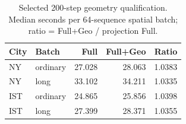 \begin{table}[t]
\centering\footnotesize
\setlength{\tabcolsep}{3pt}
\caption{Selected 200-step geometry qualification. Median seconds per 64-sequence spatial batch; ratio = Full+Geo / projection Full.}
\label{tab:cost}
\begin{tabular}{llrrr}
\toprule
City & Batch & Full & Full+Geo & Ratio \\
\midrule
NY & ordinary & 27.028 & 28.063 & 1.0383 \\
NY & long & 33.102 & 34.211 & 1.0335 \\
IST & ordinary & 24.865 & 25.856 & 1.0398 \\
IST & long & 27.399 & 28.371 & 1.0355 \\
\bottomrule
\end{tabular}
\end{table}
